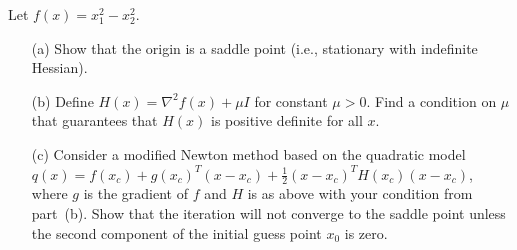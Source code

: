 \documentclass[11pt]{article}
\begin{document}
Let $f(x)=x_1^2-x_2^2$.
\begin{enumerate}
\item[(a)] Show that the origin is a saddle point (i.e., stationary with indefinite Hessian).
\item[(b)] Define $H(x)=\nabla^2f(x)+\mu I$ for constant $\mu>0$. Find a condition on $\mu$ that guarantees that $H(x)$ is positive definite for all $x$. 
\item[(c)] Consider a modified Newton method based on the quadratic model $q(x) = f(x_c) + g(x_c)^T(x-x_c)+\frac{1}{2} (x-x_c)^TH(x_c)(x-x_c)$, where $g$ is the gradient of $f$ and $H$ is as above with your condition from part~(b). Show that the iteration will not converge to the saddle point unless the second component of the initial guess point $x_0$ is zero. 
\end{enumerate}
\end{document}
